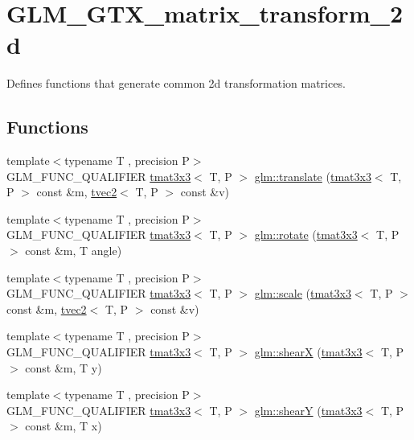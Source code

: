\hypertarget{group__gtx__matrix__transform__2d}{}\section{G\+L\+M\+\_\+\+G\+T\+X\+\_\+matrix\+\_\+transform\+\_\+2d}
\label{group__gtx__matrix__transform__2d}


Defines functions that generate common 2d transformation matrices.  


\subsection*{Functions}
\begin{DoxyCompactItemize}
\item 
{\footnotesize template$<$typename T , precision P$>$ }\\G\+L\+M\+\_\+\+F\+U\+N\+C\+\_\+\+Q\+U\+A\+L\+I\+F\+I\+ER \hyperlink{structglm_1_1tmat3x3}{tmat3x3}$<$ T, P $>$ \hyperlink{group__gtx__matrix__transform__2d_ga3786656ac137084ef73151636eff44d8}{glm\+::translate} (\hyperlink{structglm_1_1tmat3x3}{tmat3x3}$<$ T, P $>$ const \&m, \hyperlink{structglm_1_1tvec2}{tvec2}$<$ T, P $>$ const \&v)
\item 
{\footnotesize template$<$typename T , precision P$>$ }\\G\+L\+M\+\_\+\+F\+U\+N\+C\+\_\+\+Q\+U\+A\+L\+I\+F\+I\+ER \hyperlink{structglm_1_1tmat3x3}{tmat3x3}$<$ T, P $>$ \hyperlink{group__gtx__matrix__transform__2d_ga23ec870ee4b75d85cc021e0fd1532b48}{glm\+::rotate} (\hyperlink{structglm_1_1tmat3x3}{tmat3x3}$<$ T, P $>$ const \&m, T angle)
\item 
{\footnotesize template$<$typename T , precision P$>$ }\\G\+L\+M\+\_\+\+F\+U\+N\+C\+\_\+\+Q\+U\+A\+L\+I\+F\+I\+ER \hyperlink{structglm_1_1tmat3x3}{tmat3x3}$<$ T, P $>$ \hyperlink{group__gtx__matrix__transform__2d_gadb9f2a729d399ae5e9c33eb64d0d66fe}{glm\+::scale} (\hyperlink{structglm_1_1tmat3x3}{tmat3x3}$<$ T, P $>$ const \&m, \hyperlink{structglm_1_1tvec2}{tvec2}$<$ T, P $>$ const \&v)
\item 
{\footnotesize template$<$typename T , precision P$>$ }\\G\+L\+M\+\_\+\+F\+U\+N\+C\+\_\+\+Q\+U\+A\+L\+I\+F\+I\+ER \hyperlink{structglm_1_1tmat3x3}{tmat3x3}$<$ T, P $>$ \hyperlink{group__gtx__matrix__transform__2d_gab3363478cb625e40c5bd924fd838cf54}{glm\+::shearX} (\hyperlink{structglm_1_1tmat3x3}{tmat3x3}$<$ T, P $>$ const \&m, T y)
\item 
{\footnotesize template$<$typename T , precision P$>$ }\\G\+L\+M\+\_\+\+F\+U\+N\+C\+\_\+\+Q\+U\+A\+L\+I\+F\+I\+ER \hyperlink{structglm_1_1tmat3x3}{tmat3x3}$<$ T, P $>$ \hyperlink{group__gtx__matrix__transform__2d_ga69bfb47d250df7464a5b14f2b95a9b4a}{glm\+::shearY} (\hyperlink{structglm_1_1tmat3x3}{tmat3x3}$<$ T, P $>$ const \&m, T x)
\end{DoxyCompactItemize}


